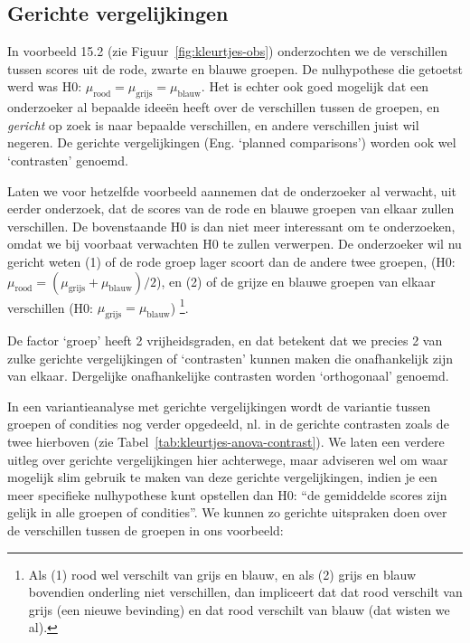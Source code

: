 \documentclass[
]{book}
\begin{document}
\hypertarget{sec:anova-oneway-gericht}{%
\subsection{Gerichte vergelijkingen}\label{sec:anova-oneway-gericht}}

In voorbeeld 15.2 (zie
Figuur~\ref{fig:kleurtjes-obs}) onderzochten we de verschillen tussen
scores uit de rode, zwarte en blauwe groepen. De nulhypothese die
getoetst werd was H0:
\(\mu_\textrm{rood} = \mu_\textrm{grijs} = \mu_\textrm{blauw}\).
Het is
echter ook goed mogelijk dat een onderzoeker al bepaalde ideeën heeft
over de verschillen tussen de groepen, en \emph{gericht} op zoek is naar
bepaalde verschillen, en andere verschillen juist wil negeren. De
gerichte vergelijkingen (Eng. `planned comparisons') worden ook wel
`contrasten' genoemd.

Laten we voor hetzelfde voorbeeld aannemen dat de onderzoeker al
verwacht, uit eerder onderzoek, dat de scores van de rode en blauwe
groepen van elkaar zullen verschillen. De bovenstaande H0 is dan niet
meer interessant om te onderzoeken, omdat we bij voorbaat verwachten H0
te zullen verwerpen. De onderzoeker wil nu gericht weten
(1) of de rode
groep lager scoort dan de andere twee groepen, (H0:
\(\mu_\textrm{rood} = (\mu_\textrm{grijs}+\mu_\textrm{blauw})/2\)), en
(2)
of de grijze en blauwe groepen van elkaar verschillen (H0:
\(\mu_\textrm{grijs} = \mu_\textrm{blauw}\))
\footnote{Als (1) rood wel verschilt van grijs en blauw, en als (2) grijs en blauw bovendien onderling niet verschillen, dan impliceert dat dat rood verschilt van grijs (een nieuwe bevinding) en dat rood verschilt van blauw (dat wisten we al).}.

De factor `groep' heeft 2 vrijheidsgraden, en dat betekent dat we
precies 2 van zulke gerichte vergelijkingen of `contrasten' kunnen maken
die onafhankelijk zijn van elkaar. Dergelijke onafhankelijke contrasten
worden `orthogonaal' genoemd.

In een variantieanalyse met gerichte vergelijkingen wordt de variantie
tussen groepen of condities nog verder opgedeeld, nl. in de gerichte
contrasten zoals de twee hierboven (zie
Tabel~\ref{tab:kleurtjes-anova-contrast}). We laten een verdere uitleg
over gerichte vergelijkingen hier achterwege, maar adviseren wel om waar
mogelijk slim gebruik te maken van deze gerichte vergelijkingen, indien
je een meer specifieke nulhypothese kunt opstellen dan H0: ``de
gemiddelde scores zijn gelijk in alle groepen of condities''. We kunnen
zo gerichte uitspraken doen over de verschillen tussen de groepen in ons
voorbeeld:
\end{document}
